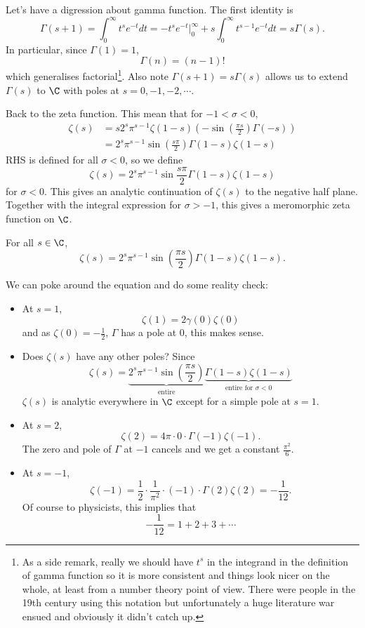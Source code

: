 \documentclass[a4paper]{article}
\theoremstyle{definition}
\begin{document}
Let's have a digression about gamma function. The first identity is
\[
  \Gamma(s + 1)
  = \int_0^\infty t^s e^{-t} dt
  = -t^s e^{-t} \big|_0^\infty + s \int_0^\infty t^{s - 1} e^{-t} dt
  = s \Gamma(s).
\]
In particular, since \(\Gamma(1) = 1\),
\[
  \Gamma(n) = (n - 1)!
\]
which generalises factorial\footnote{As a side remark, really we should have \(t^s\) in the integrand in the definition of gamma function so it is more consistent and things look nicer on the whole, at least from a number theory point of view. There were people in the 19th century using this notation but unfortunately a huge literature war ensued and obviously it didn't catch up.}. Also note \(\Gamma(s + 1) = s \Gamma(s)\) allows us to extend \(\Gamma(s)\) to \(\C\) with poles at \(s = 0, -1, -2, \cdots\).

Back to the zeta function. This mean that for \(-1 < \sigma < 0\),
\begin{align*}
  \zeta(s)
  &= s 2^s \pi^{s - 1} \zeta(1 - s) (- \sin \left( \frac{\pi s}{2} \right) \Gamma(-s)) \\
  &= 2^s \pi^{s - 1} \sin \left( \frac{s \pi}{2} \right) \Gamma(1 - s) \zeta(1 - s)
\end{align*}
RHS is defined for all \(\sigma < 0\), so we define
\[
  \zeta(s) = 2^s \pi^{s - 1} \sin \frac{s \pi}{2} \Gamma(1 - s) \zeta(1 - s)
\]
for \(\sigma < 0\). This gives an analytic continuation of \(\zeta(s)\) to the negative half plane. Together with the integral expression for \(\sigma > -1\), this gives a meromorphic zeta function on \(\C\).

\begin{theorem}
  For all \(s \in \C\),
  \[
    \zeta(s) = 2^s \pi^{s - 1} \sin \left( \frac{\pi s}{2} \right) \Gamma(1 - s) \zeta(1 - s).
  \]
\end{theorem}

We can poke around the equation and do some reality check:
\begin{itemize}
\item At \(s = 1\),
  \[
    \zeta(1) = 2 \gamma(0) \zeta(0)
  \]
  and as \(\zeta(0) = -\frac{1}{2}\), \(\Gamma\) has a pole at \(0\), this makes sense.
\item Does \(\zeta(s)\) have any other poles? Since
  \[
    \zeta(s) = \underbrace{2^s \pi^{s - 1} \sin \left( \frac{\pi s}{2} \right)}_{\text{entire}} \underbrace{\Gamma(1 - s) \zeta(1 - s)}_{\text{entire for } \sigma < 0}
  \]
  \(\zeta(s)\) is analytic everywhere in \(\C\) except for a simple pole at \(s = 1\).
\item At \(s = 2\),
  \[
    \zeta(2) = 4 \pi \cdot 0 \cdot \Gamma(-1) \zeta(-1).
  \]
  The zero and pole of \(\Gamma\) at \(-1\) cancels and we get a constant \(\frac{\pi^2}{6}\).
\item At \(s = -1\),
  \[
    \zeta(-1)
    = \frac{1}{2} \cdot \frac{1}{\pi^2} \cdot (-1) \cdot \Gamma(2) \zeta(2)
    = -\frac{1}{12}.
  \]
  Of course to physicists, this implies that
  \[
    -\frac{1}{12} = 1 + 2 + 3 + \cdots
  \]
\end{itemize}
\end{document}
